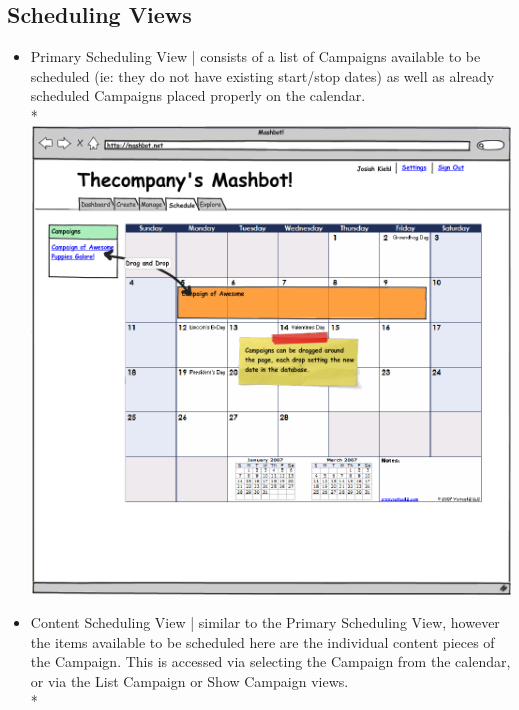 \documentclass{report}
\begin{document}
\subsection{Scheduling Views}
\begin{itemize}
  \item Primary Scheduling View |  consists of a list of Campaigns available to be scheduled (ie: they do not have existing start/stop dates) as well as already scheduled Campaigns placed properly on the calendar. \\*
  \includegraphics[width=\textwidth]{../mockups/schedule.png}
  \item Content Scheduling View | similar to the Primary Scheduling View, however the items available to be scheduled here are the individual content pieces of the Campaign.  This is accessed via selecting the Campaign from the calendar, or via the List Campaign or Show Campaign views. \\*

\end{itemize}
\end{document}
